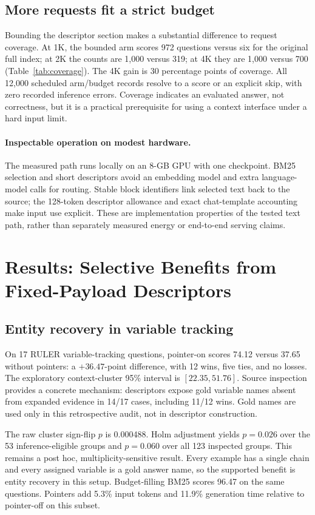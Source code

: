 \documentclass[runningheads]{llncs}
\begin{document}
\subsection{More requests fit a strict budget}

Bounding the descriptor section makes a substantial difference to request coverage. At 1K, the bounded arm scores 972 questions versus six for the original full index; at 2K the counts are 1,000 versus 319; at 4K they are 1,000 versus 700 (Table~\ref{tab:coverage}). The 4K gain is 30 percentage points of coverage. All 12,000 scheduled arm/budget records resolve to a score or an explicit skip, with zero recorded inference errors. Coverage indicates an evaluated answer, not correctness, but it is a practical prerequisite for using a context interface under a hard input limit.

\paragraph{Inspectable operation on modest hardware.}
The measured path runs locally on an 8-GB GPU with one checkpoint. BM25 selection and short descriptors avoid an embedding model and extra language-model calls for routing. Stable block identifiers link selected text back to the source; the 128-token descriptor allowance and exact chat-template accounting make input use explicit. These are implementation properties of the tested text path, rather than separately measured energy or end-to-end serving claims.

\section{Results: Selective Benefits from Fixed-Payload Descriptors}
\subsection{Entity recovery in variable tracking}
On 17 RULER variable-tracking questions, pointer-on scores 74.12 versus 37.65 without pointers: a $+36.47$-point difference, with 12 wins, five ties, and no losses. The exploratory context-cluster 95\% interval is $[22.35,51.76]$. Source inspection provides a concrete mechanism: descriptors expose gold variable names absent from expanded evidence in 14/17 cases, including 11/12 wins. Gold names are used only in this retrospective audit, not in descriptor construction.

The raw cluster sign-flip $p$ is 0.000488. Holm adjustment yields $p=0.026$ over the 53 inference-eligible groups and $p=0.060$ over all 123 inspected groups. This remains a post hoc, multiplicity-sensitive result. Every example has a single chain and every assigned variable is a gold answer name, so the supported benefit is entity recovery in this setup. Budget-filling BM25 scores 96.47 on the same questions. Pointers add 5.3\% input tokens and 11.9\% generation time relative to pointer-off on this subset.
\end{document}
